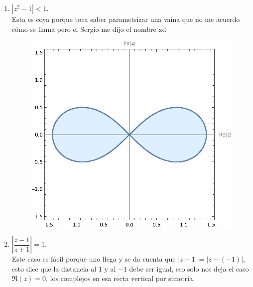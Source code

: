 \documentclass[11pt]{article}
\begin{document}
\begin{enumerate}
\begin{enumerate}
        \item $|z^2 - 1| < 1$.\\

        Esta es coya porque toca saber parametrizar una vaina que no me acuerdo cómo se llama pero el Sergio me dijo el nombre xd


         \begin{figure}[H]
         \centering
         \includegraphics[scale=0.8]{R4.eps}
         \end{figure}

        \item $\left| \dfrac{z - 1}{z + 1} \right| = 1$.\\

        Este caso es fácil porque uno llega y se da cuenta que $|z-1|=|z-(-1)|$, esto dice que la distancia al $1$ y al $-1$ debe ser igual, eso solo nos deja el caso $\Re(z)=0$, los complejos en esa recta vertical por simetría.\\


\end{enumerate}
\end{enumerate}
\end{document}
